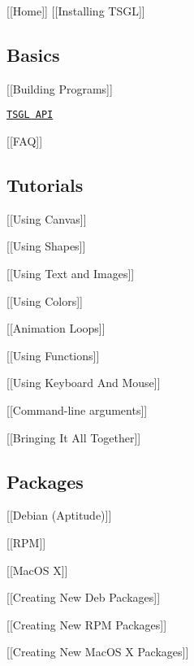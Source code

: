 \mbox{[}\mbox{[}Home\mbox{]}\mbox{]} \mbox{[}\mbox{[}Installing T\-S\-G\-L\mbox{]}\mbox{]}

\subsection*{Basics}


\begin{DoxyItemize}
\item \mbox{[}\mbox{[}Building Programs\mbox{]}\mbox{]}
\item \href{http://calvin-cs.github.io/TSGL/html/annotated.html}{\tt T\-S\-G\-L A\-P\-I}
\item \mbox{[}\mbox{[}F\-A\-Q\mbox{]}\mbox{]}
\end{DoxyItemize}

\subsection*{Tutorials}


\begin{DoxyItemize}
\item \mbox{[}\mbox{[}Using Canvas\mbox{]}\mbox{]}
\item \mbox{[}\mbox{[}Using Shapes\mbox{]}\mbox{]}
\item \mbox{[}\mbox{[}Using Text and Images\mbox{]}\mbox{]}
\item \mbox{[}\mbox{[}Using Colors\mbox{]}\mbox{]}
\item \mbox{[}\mbox{[}Animation Loops\mbox{]}\mbox{]}
\item \mbox{[}\mbox{[}Using Functions\mbox{]}\mbox{]}
\item \mbox{[}\mbox{[}Using Keyboard And Mouse\mbox{]}\mbox{]}
\item \mbox{[}\mbox{[}Command-\/line arguments\mbox{]}\mbox{]}
\item \mbox{[}\mbox{[}Bringing It All Together\mbox{]}\mbox{]}
\end{DoxyItemize}

\subsection*{Packages}


\begin{DoxyItemize}
\item \mbox{[}\mbox{[}Debian (Aptitude)\mbox{]}\mbox{]}
\item \mbox{[}\mbox{[}R\-P\-M\mbox{]}\mbox{]}
\item \mbox{[}\mbox{[}Mac\-O\-S X\mbox{]}\mbox{]}
\item \mbox{[}\mbox{[}Creating New Deb Packages\mbox{]}\mbox{]}
\item \mbox{[}\mbox{[}Creating New R\-P\-M Packages\mbox{]}\mbox{]}
\item \mbox{[}\mbox{[}Creating New Mac\-O\-S X Packages\mbox{]}\mbox{]}
\end{DoxyItemize}

